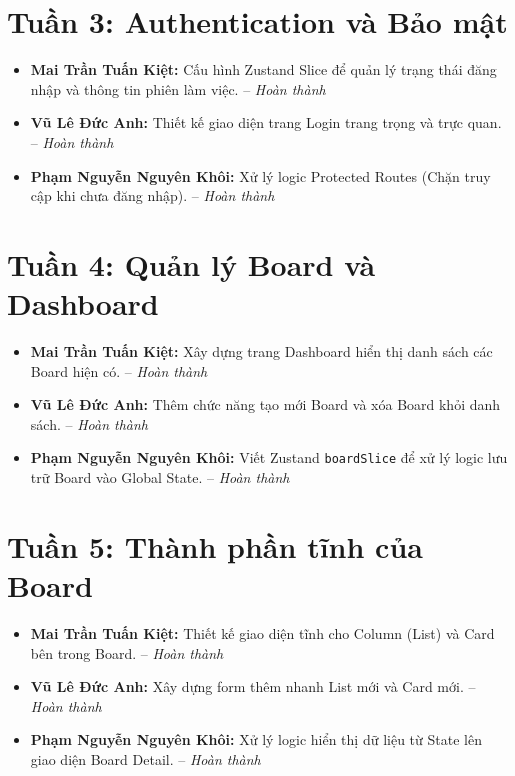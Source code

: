 \section*{Tuần 3: Authentication và Bảo mật}
\begin{itemize}
    \item \textbf{Mai Trần Tuấn Kiệt:} Cấu hình Zustand Slice để quản lý trạng thái đăng nhập và thông tin phiên làm việc. -- \textit{Hoàn thành}
    \item \textbf{Vũ Lê Đức Anh:} Thiết kế giao diện trang Login trang trọng và trực quan. -- \textit{Hoàn thành}
    \item \textbf{Phạm Nguyễn Nguyên Khôi:} Xử lý logic Protected Routes (Chặn truy cập khi chưa đăng nhập). -- \textit{Hoàn thành}
\end{itemize}

\section*{Tuần 4: Quản lý Board và Dashboard}
\begin{itemize}
    \item \textbf{Mai Trần Tuấn Kiệt:} Xây dựng trang Dashboard hiển thị danh sách các Board hiện có. -- \textit{Hoàn thành}
    \item \textbf{Vũ Lê Đức Anh:} Thêm chức năng tạo mới Board và xóa Board khỏi danh sách. -- \textit{Hoàn thành}
    \item \textbf{Phạm Nguyễn Nguyên Khôi:} Viết Zustand \texttt{boardSlice} để xử lý logic lưu trữ Board vào Global State. -- \textit{Hoàn thành}
\end{itemize}

\section*{Tuần 5: Thành phần tĩnh của Board}
\begin{itemize}
    \item \textbf{Mai Trần Tuấn Kiệt:} Thiết kế giao diện tĩnh cho Column (List) và Card bên trong Board. -- \textit{Hoàn thành}
    \item \textbf{Vũ Lê Đức Anh:} Xây dựng form thêm nhanh List mới và Card mới. -- \textit{Hoàn thành}
    \item \textbf{Phạm Nguyễn Nguyên Khôi:} Xử lý logic hiển thị dữ liệu từ State lên giao diện Board Detail. -- \textit{Hoàn thành}
\end{itemize}

